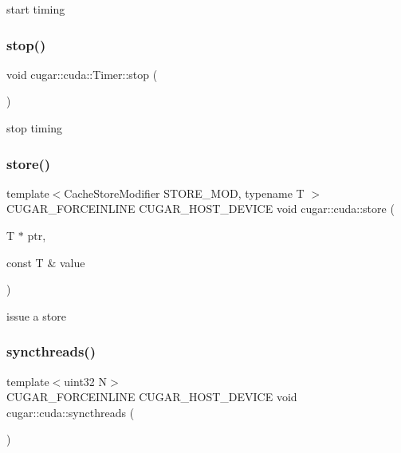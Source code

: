 start timing \mbox{\label{group___c_u_d_a_module_gaa3d28081d1d907e01ad0533197189009}} 
\subsubsection{\texorpdfstring{stop()}{stop()}}
{\footnotesize\ttfamily void cugar\+::cuda\+::\+Timer\+::stop (\begin{DoxyParamCaption}{ }\end{DoxyParamCaption})\hspace{0.3cm}{\ttfamily [inline]}}

stop timing \mbox{\label{group___c_u_d_a_module_ga472f45d1a143f42df19bab271121f481}} 
\subsubsection{\texorpdfstring{store()}{store()}}
{\footnotesize\ttfamily template$<$Cache\+Store\+Modifier S\+T\+O\+R\+E\+\_\+\+M\+OD, typename T $>$ \\
C\+U\+G\+A\+R\+\_\+\+F\+O\+R\+C\+E\+I\+N\+L\+I\+NE C\+U\+G\+A\+R\+\_\+\+H\+O\+S\+T\+\_\+\+D\+E\+V\+I\+CE void cugar\+::cuda\+::store (\begin{DoxyParamCaption}\item[{T $\ast$}]{ptr,  }\item[{const T \&}]{value }\end{DoxyParamCaption})}

issue a store \mbox{\label{group___c_u_d_a_module_ga7cd39b01cdfc18283bcd4bee3fabcaf9}} 
\subsubsection{\texorpdfstring{syncthreads()}{syncthreads()}}
{\footnotesize\ttfamily template$<$uint32 N$>$ \\
C\+U\+G\+A\+R\+\_\+\+F\+O\+R\+C\+E\+I\+N\+L\+I\+NE C\+U\+G\+A\+R\+\_\+\+H\+O\+S\+T\+\_\+\+D\+E\+V\+I\+CE void cugar\+::cuda\+::syncthreads (\begin{DoxyParamCaption}{ }\end{DoxyParamCaption})}

